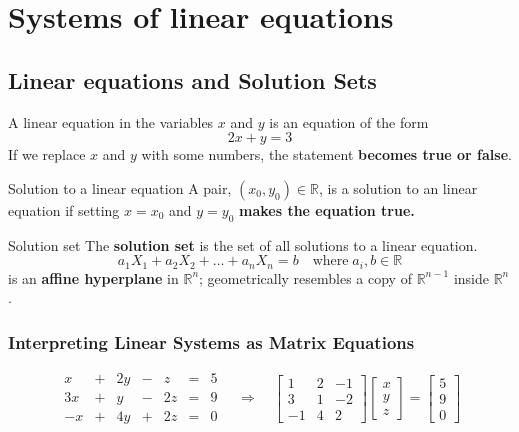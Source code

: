 \documentclass[a4paper, 9pt]{extarticle}
\begin{document}
\section{Systems of linear equations}
\subsection{Linear equations and Solution Sets}
A linear equation in the variables $x$ and
$y$ is an equation of the form
\begin{equation*}
  2x + y = 3
\end{equation*}
If we replace $x$ and $y$ with some numbers, the statement \textbf{becomes true or false}.

\begin{definitionbox}{Solution to a linear equation}{}
  A pair, $(x_0, y_0) \in \mathbb{R}$, is a solution to an linear equation if setting $x = x_0$ and $y = y_0$ \textbf{makes the equation true.}
\end{definitionbox}

\begin{definitionbox}{Solution set}{}
  The \textbf{solution set} is the set of all solutions to a linear equation.
  $$a_1X_1 + a_2X_2 + \ldots + a_nX_n = b \quad \text{where} \; a_i, b \in \mathbb{R}$$
  is an \textbf{affine hyperplane} in $\mathbb{R}^n$; geometrically resembles a copy of $\mathbb{R}^{n-1}$ inside $\mathbb{R}^n$.
\end{definitionbox}
\subsubsection{Interpreting Linear Systems as Matrix Equations}
$$
  \begin{array}{ccccccc}
    x  & + & 2y & - & z  & = & 5 \\
    3x & + & y  & - & 2z & = & 9 \\
    -x & + & 4y & + & 2z & = & 0
  \end{array}
  \quad \Rightarrow \quad
  \begin{bmatrix}
    1  & 2 & -1 \\
    3  & 1 & -2 \\
    -1 & 4 & 2
  \end{bmatrix}
  \begin{bmatrix}
    x \\
    y \\
    z
  \end{bmatrix}
  =
  \begin{bmatrix}
    5 \\
    9 \\
    0
  \end{bmatrix}
$$
\end{document}
